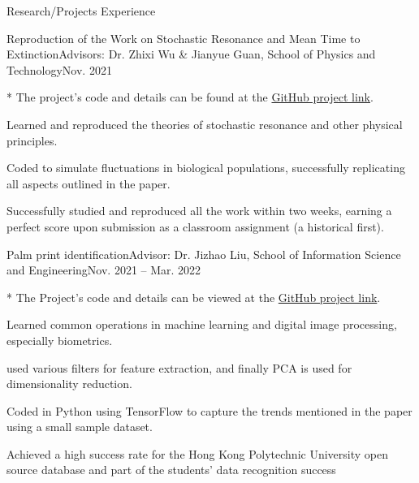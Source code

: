 \documentclass[]{kyvernitis-resume}
\begin{document}
\begin{section}{\Large Research/Projects Experience}
\begin{subsection}{Reproduction of the Work on Stochastic Resonance and Mean Time to Extinction}{Advisors: Dr. Zhixi Wu \& Jianyue Guan, School of Physics and Technology}{Nov. 2021}{}
        \item[*] The project's code and details can be found at the \href{https://github.com/Wang-Zhiping/reproduced-the-work-of-the-article-PhysRevE.104.024133}{GitHub project link}.
        \item Learned and reproduced the theories of stochastic resonance and other physical principles.
        \item Coded to simulate fluctuations in biological populations, successfully replicating all aspects outlined in the paper.
        \item Successfully studied and reproduced all the work within two weeks, earning a perfect score upon submission as a classroom assignment (a historical first).
\end{subsection}


        \begin{subsection}{Palm print identification}{Advisor: Dr. Jizhao Liu, School of Information Science and Engineering}{Nov. 2021 – Mar. 2022}{}
        \item[*] The Project's code and details can be viewed at the \href{https://github.com/Wang-Zhiping/palmprint-recognition}{GitHub project link}.
        \item Learned common operations in machine learning and digital image processing, especially biometrics.
        \item used various filters for feature extraction, and finally PCA is used for dimensionality reduction.
        \item Coded in Python using TensorFlow to capture the trends mentioned in the paper using a small sample dataset.
        \item Achieved a high success rate for the Hong Kong Polytechnic University open source database and part of the students' data recognition success
    \end{subsection}



\end{section}
\end{document}
